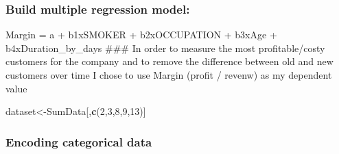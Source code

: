 \documentclass[]{article}
\newenvironment{Shaded}{\begin{snugshade}}{\end{snugshade}}
\newcommand{\KeywordTok}[1]{\textcolor[rgb]{0.13,0.29,0.53}{\textbf{#1}}}
\newcommand{\DataTypeTok}[1]{\textcolor[rgb]{0.13,0.29,0.53}{#1}}
\newcommand{\DecValTok}[1]{\textcolor[rgb]{0.00,0.00,0.81}{#1}}
\newcommand{\StringTok}[1]{\textcolor[rgb]{0.31,0.60,0.02}{#1}}
\newcommand{\OperatorTok}[1]{\textcolor[rgb]{0.81,0.36,0.00}{\textbf{#1}}}
\newcommand{\NormalTok}[1]{#1}
\begin{document}
\subsubsection{Build multiple regression
model:}\label{build-multiple-regression-model}

Margin = a + b1xSMOKER + b2xOCCUPATION + b3xAge + b4xDuration\_by\_days
\#\#\# In order to measure the most profitable/costy customers for the
company and to remove the difference between old and new customers over
time I chose to use Margin (profit / revenw) as my dependent value

\begin{Shaded}
\begin{Highlighting}[]
\NormalTok{dataset<-SumData[,}\KeywordTok{c}\NormalTok{(}\DecValTok{2}\NormalTok{,}\DecValTok{3}\NormalTok{,}\DecValTok{8}\NormalTok{,}\DecValTok{9}\NormalTok{,}\DecValTok{13}\NormalTok{)]}
\end{Highlighting}
\end{Shaded}

\subsubsection{Encoding categorical
data}\label{encoding-categorical-data}

\begin{Shaded}
\end{Shaded}
\end{document}
